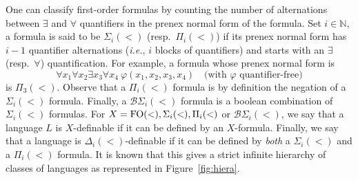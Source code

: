 \documentclass[envcountsame]{llncs}
\newcommand\nat{\ensuremath{\mathbb{N}}\xspace}
\newcommand{\dew}[1]{\ensuremath{\Delta_{#1}(<)}\xspace}
\newcommand{\siw}[1]{\ensuremath{\Sigma_{#1}(<)}\xspace}
\newcommand{\piw}[1]{\ensuremath{\Pi_{#1}(<)}\xspace}
\newcommand{\bsw}[1]{\ensuremath{\mathcal{B}\Sigma_{#1}(<)}\xspace}
\newcommand{\piwt}{\ensuremath{\Pi_{3}(<)}\xspace}
\newcommand{\fow}{\ensuremath{\textup{FO}(<)}\xspace}
\begin{document}
One can classify first-order formulas by counting the number of
alternations between $\exists$ and $\forall$ quantifiers in the prenex
normal form of the formula. Set $i \in \nat$, a formula is said to be
\siw{i} (resp.\ \piw{i}) if its prenex normal form has $i -1$
quantifier alternations (\emph{i.e.}, $i$ blocks of quantifiers) and starts
with an $\exists$  (resp.\ $\forall$) quantification. For example, a
formula whose prenex normal form is
\[
\forall x_1 \forall x_2 \exists x_3 \forall x_4
\ \varphi(x_1,x_2,x_3,x_4) \quad \text{(with $\varphi$ quantifier-free)}
\]
\noindent
is \piwt. Observe that a \piw{i} formula is by definition the negation of a
\siw{i} formula. Finally, a \bsw{i} formula is a boolean combination of
\siw{i} formulas. For $X = \fow,\siw{i},\piw{i}$ or $\bsw{i}$, we say that a
language $L$ is $X$-definable if it can be defined by an $X$-formula. Finally,
we say that a language is \dew{i}-definable if it can be defined by
\emph{both} a \siw{i} and a \piw{i} formula. It is known that this gives a
strict infinite hierarchy of classes of languages as represented in
Figure~\ref{fig:hiera}.
\end{document}
